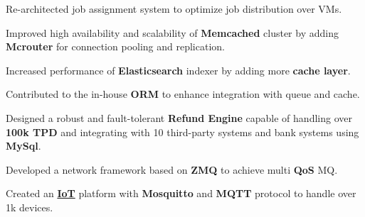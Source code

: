 \documentclass[]{plushcv}
\begin{document}
\begin{minipage}[t]{0.70\textwidth}
\vspace{5pt} %

\begin{tightemize}
\item Re-architected job assignment system to optimize job distribution over VMs.
\item Improved high availability and scalability of \textbf{Memcached} cluster by adding \textbf{Mcrouter} for connection pooling and replication.
\item Increased performance of \textbf{Elasticsearch} indexer by adding more \textbf{cache layer}.
\item Contributed to the in-house \textbf{ORM} to enhance integration with queue and cache.
\end{tightemize}

\vspace{5pt} %
\begin{tightemize}
\item  Designed a robust and fault-tolerant \textbf{Refund Engine} capable of handling over \textbf{100k TPD} and integrating with 10 third-party systems and bank systems using \textbf{MySql}.

\end{tightemize}
\sectionsep

\vspace{2pt}
\begin{tightemize}

\item Developed a network framework based on \textbf{ZMQ} to achieve multi \textbf{QoS} MQ.
\end{tightemize}
\sectionsep
{}
\begin{tightemize}
\item Created an \href{https://en.wikipedia.org/wiki/Internet_of_things}{\textbf{IoT}} platform with \textbf{Mosquitto} and \textbf{MQTT} protocol to handle over 1k devices.


\end{tightemize}
\end{minipage}
\end{document}
